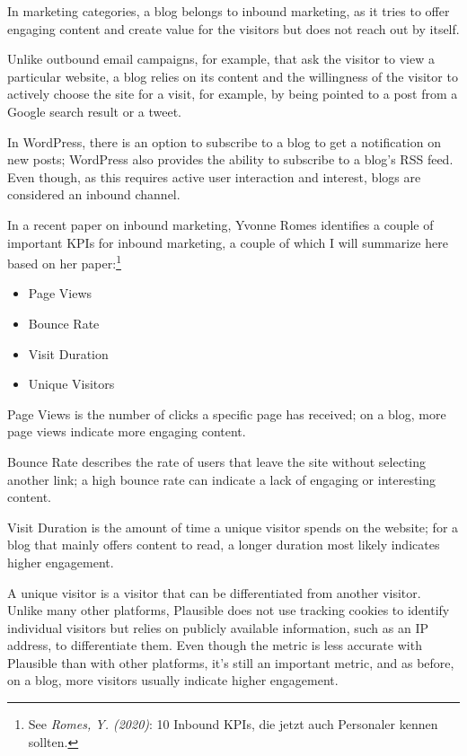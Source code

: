 In marketing categories, a blog belongs to inbound marketing, as it tries to offer engaging content and create value for the visitors but does not reach out by itself. 

Unlike outbound email campaigns, for example, that ask the visitor to view a particular website, a blog relies on its content and the willingness of the visitor to actively choose the site for a visit, for example, by being pointed to a post from a Google search result or a tweet.

In WordPress, there is an option to subscribe to a blog to get a notification on new posts; WordPress also provides the ability to subscribe to a blog's RSS feed. Even though, as this requires active user interaction and interest, blogs are considered an inbound channel.

In a recent paper on inbound marketing, Yvonne Romes identifies a couple of important KPIs for inbound marketing, a couple of which I will summarize here based on her paper:\footnote{See \textit{Romes, Y. (2020)}: 10 Inbound KPIs, die jetzt auch Personaler kennen sollten.\cite{inboundKPI}}

\begin{itemize}
\item Page Views
\item Bounce Rate
\item Visit Duration
\item Unique Visitors
\end{itemize}

Page Views is the number of clicks a specific page has received; on a blog, more page views indicate more engaging content.

Bounce Rate describes the rate of users that leave the site without selecting another link; a high bounce rate can indicate a lack of engaging or interesting content.

Visit Duration is the amount of time a unique visitor spends on the website; for a blog that mainly offers content to read, a longer duration most likely indicates higher engagement.

A unique visitor is a visitor that can be differentiated from another visitor. Unlike many other platforms, Plausible does not use tracking cookies to identify individual visitors but relies on publicly available information, such as an IP address, to differentiate them. Even though the metric is less accurate with Plausible than with other platforms, it's still an important metric, and as before, on a blog, more visitors usually indicate higher engagement.

